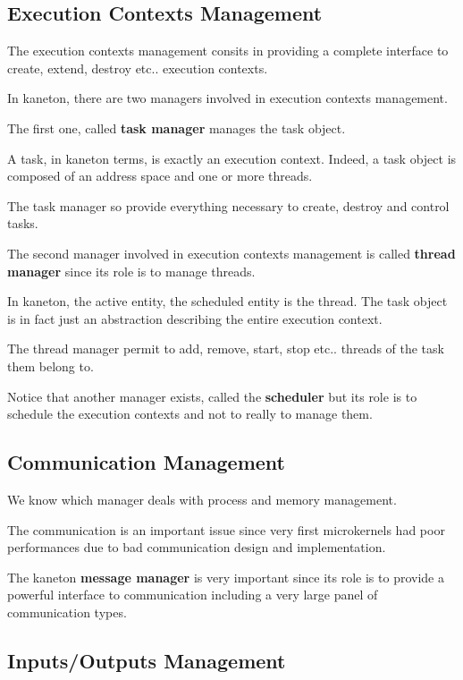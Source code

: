 \subsection{Execution Contexts Management}

The execution contexts management consits in providing a complete
interface to create, extend, destroy etc.. execution contexts.

In kaneton, there are two managers involved in execution contexts
management.

The first one, called \textbf{task manager} manages the task object.

A task, in kaneton terms, is exactly an execution context. Indeed,
a task object is composed of an address space and one or more
threads.

The task manager so provide everything necessary to create, destroy
and control tasks.

The second manager involved in execution contexts management is called
\textbf{thread manager} since its role is to manage threads.

In kaneton, the active entity, the scheduled entity is the thread. The
task object is in fact just an abstraction describing the entire execution
context.

The thread manager permit to add, remove, start, stop etc.. threads
of the task them belong to.

Notice that another manager exists, called the \textbf{scheduler} but
its role is to schedule the execution contexts and not to really to
manage them.

%
%

\subsection{Communication Management}

We know which manager deals with process and memory management.

The communication is an important issue since very first microkernels
had poor performances due to bad communication design and implementation.

The kaneton \textbf{message manager} is very important since its
role is to provide a powerful interface to communication including
a very large panel of communication types.

%
%

\subsection{Inputs/Outputs Management}

